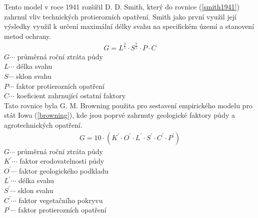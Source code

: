 Tento model v roce 1941 rozšířil D. D. Smith, který do rovnice (\ref{smith1941}) zahrnul vliv technických protierozních opatření. Smith jako první využil její výsledky využil k určení maximální délky svahu na specifickém území a stanovení metod ochrany.\cite{Smith1941}
\begin{align}
   \label{smith1941} G=L^{\frac{3}{5}}\cdot S^{\frac{7}{5}}\cdot P\cdot C
\end{align}
\hspace*{2cm}$G \cdots$ průměrná roční ztráta půdy\\
\hspace*{2cm}$L \cdots$ délka svahu \\ 
\hspace*{2cm}$S \cdots$ sklon svahu \\ 
\hspace*{2cm}$P \cdots$ faktor protierozních opatření \\
\hspace*{2cm}$C \cdots$ koeficient zahrnující ostatní faktory \\

Tato rovnice byla G. M. Browning použita pro sestavení empirického modelu pro stát Iowa (\ref{browning}), kde jsou poprvé zahrnuty geologické faktory půdy a agrotechnických opatření.\cite{browning1947}
\begin{align}
   \label{browning} G=10\cdot\left( K^{\prime}\cdot O^{\prime}\cdot  L^{\prime}\cdot S^{\prime}\cdot C^{\prime}\cdot P^{\prime} \right)
\end{align}
\hspace*{2cm}$G \cdots$ průměrná roční ztráta půdy\\
\hspace*{2cm}$K^{\prime} \cdots$ faktor erodovatelnosti půdy \\ 
\hspace*{2cm}$O^{\prime} \cdots$ faktor geologického podkladu \\  
\hspace*{2cm}$L^{\prime} \cdots$ délka svahu \\ 
\hspace*{2cm}$S^{\prime} \cdots$ sklon svahu \\ 
\hspace*{2cm}$C^{\prime} \cdots$ faktor vegetačního pokryvu \\
\hspace*{2cm}$P^{\prime} \cdots$ faktor protierozních opatření \\

